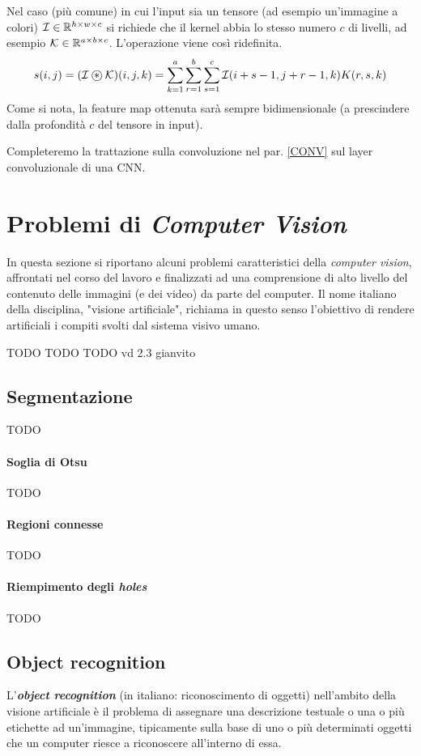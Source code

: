 Nel caso (più comune) in cui l’input sia un tensore (ad esempio un’immagine a colori) $\mathcal{I}\in\mathbb{R}^{h\times w\times c}$ si richiede che il kernel abbia lo stesso numero $c$ di livelli, ad esempio $\mathcal{K}\in\mathbb{R}^{a\times b\times c}$. L'operazione viene così ridefinita.
\begin{equation*}
s(i,j)=(\mathcal{I}\oast\mathcal{K})(i,j,k)=\sum_{k=1}^a\sum_{r=1}^b\sum_{s=1}^c\mathcal{I}(i+s-1,j+r-1,k)K(r,s,k)
\end{equation*}
Come si nota, la feature map ottenuta sarà sempre bidimensionale (a prescindere dalla profondità $c$ del tensore in input).

Completeremo la trattazione sulla convoluzione nel par. \ref{CONV} sul layer convoluzionale di una CNN.

\section{Problemi di \textit{Computer Vision}}
\label{computerVision}
In questa sezione si riportano alcuni problemi caratteristici della \textit{computer vision}, affrontati nel corso del lavoro e finalizzati ad una comprensione di alto livello del contenuto delle immagini (e dei video) da parte del computer. Il nome italiano della disciplina, "visione artificiale", richiama in questo senso l'obiettivo di rendere artificiali i compiti svolti dal sistema visivo umano.

TODO TODO TODO vd 2.3 gianvito

\subsection{Segmentazione}
TODO
\paragraph*{Soglia di Otsu}
TODO
\paragraph*{Regioni connesse}
TODO
\paragraph*{Riempimento degli \textit{holes}}
TODO

\subsection{Object recognition}
\label{objectRecognition}
L'\textbf{\textit{object recognition}} (in italiano: riconoscimento di oggetti) nell'ambito della visione artificiale è il problema di assegnare una descrizione testuale o una o più etichette ad un'immagine, tipicamente sulla base di uno o più determinati oggetti che un computer riesce a riconoscere all'interno di essa.

